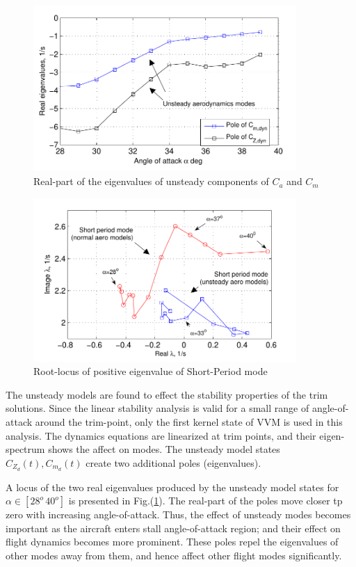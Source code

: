 \documentclass{AIAA}
\begin{document}
\begin{figure}[tb]
\begin{center}
\includegraphics[width=100mm]{Rlocus_alpha}
\caption{Real-part of the eigenvalues of unsteady components of $C_a$ and $C_m$}
\label{fig:Rlocus_alpha}
\end{center}
\end{figure}
\begin{figure}[tb]
\begin{center}
\includegraphics[width=100mm]{Rlocus_SP}
\caption{Root-locus of positive eigenvalue of Short-Period mode}
\label{fig:Rlocus_SP}
\end{center}
\end{figure}

The unsteady models are found to effect the stability properties of the trim solutions. Since the linear stability analysis is valid for a small range of angle-of-attack around the trim-point, only the first kernel state of VVM is used in this analysis. The dynamics equations are linearized at trim points, and their eigen-spectrum shows the affect on modes. The unsteady model states $C_{Z_d}(t),C_{m_d}(t)$ create two additional poles (eigenvalues). 

A locus of the two real eigenvalues produced by the unsteady model states for $\alpha \in [28^o \, 40^o]$ is presented in Fig.(\ref{fig:Rlocus_alpha}). The real-part of the poles move closer tp zero with increasing angle-of-attack. Thus, the effect of unsteady modes becomes important as the aircraft enters stall angle-of-attack region; and their effect on flight dynamics becomes more prominent. These poles repel the eigenvalues of other modes away from them, and hence affect other flight modes significantly.
\end{document}
